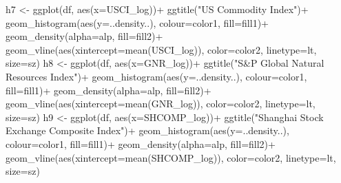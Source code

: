 \documentclass[
]{article}
\newenvironment{Shaded}{\begin{snugshade}}{\end{snugshade}}
\newcommand{\AttributeTok}[1]{\textcolor[rgb]{0.77,0.63,0.00}{#1}}
\newcommand{\FunctionTok}[1]{\textcolor[rgb]{0.00,0.00,0.00}{#1}}
\newcommand{\NormalTok}[1]{#1}
\newcommand{\OtherTok}[1]{\textcolor[rgb]{0.56,0.35,0.01}{#1}}
\newcommand{\SpecialCharTok}[1]{\textcolor[rgb]{0.00,0.00,0.00}{#1}}
\newcommand{\StringTok}[1]{\textcolor[rgb]{0.31,0.60,0.02}{#1}}
\begin{document}
\begin{Shaded}
\begin{Highlighting}[]
\NormalTok{h7 }\OtherTok{\textless{}{-}} \FunctionTok{ggplot}\NormalTok{(df, }\FunctionTok{aes}\NormalTok{(}\AttributeTok{x=}\NormalTok{USCI\_log))}\SpecialCharTok{+} \FunctionTok{ggtitle}\NormalTok{(}\StringTok{"US Commodity Index"}\NormalTok{)}\SpecialCharTok{+}
  \FunctionTok{geom\_histogram}\NormalTok{(}\FunctionTok{aes}\NormalTok{(}\AttributeTok{y=}\NormalTok{..density..), }\AttributeTok{colour=}\NormalTok{color1, }\AttributeTok{fill=}\NormalTok{fill1)}\SpecialCharTok{+}
  \FunctionTok{geom\_density}\NormalTok{(}\AttributeTok{alpha=}\NormalTok{alp, }\AttributeTok{fill=}\NormalTok{fill2)}\SpecialCharTok{+}
  \FunctionTok{geom\_vline}\NormalTok{(}\FunctionTok{aes}\NormalTok{(}\AttributeTok{xintercept=}\FunctionTok{mean}\NormalTok{(USCI\_log)), }\AttributeTok{color=}\NormalTok{color2, }\AttributeTok{linetype=}\NormalTok{lt, }\AttributeTok{size=}\NormalTok{sz)}
\NormalTok{h8 }\OtherTok{\textless{}{-}} \FunctionTok{ggplot}\NormalTok{(df, }\FunctionTok{aes}\NormalTok{(}\AttributeTok{x=}\NormalTok{GNR\_log))}\SpecialCharTok{+} \FunctionTok{ggtitle}\NormalTok{(}\StringTok{"S\&P Global Natural Resources Index"}\NormalTok{)}\SpecialCharTok{+}
  \FunctionTok{geom\_histogram}\NormalTok{(}\FunctionTok{aes}\NormalTok{(}\AttributeTok{y=}\NormalTok{..density..), }\AttributeTok{colour=}\NormalTok{color1, }\AttributeTok{fill=}\NormalTok{fill1)}\SpecialCharTok{+}
  \FunctionTok{geom\_density}\NormalTok{(}\AttributeTok{alpha=}\NormalTok{alp, }\AttributeTok{fill=}\NormalTok{fill2)}\SpecialCharTok{+}
  \FunctionTok{geom\_vline}\NormalTok{(}\FunctionTok{aes}\NormalTok{(}\AttributeTok{xintercept=}\FunctionTok{mean}\NormalTok{(GNR\_log)), }\AttributeTok{color=}\NormalTok{color2, }\AttributeTok{linetype=}\NormalTok{lt, }\AttributeTok{size=}\NormalTok{sz)}
\NormalTok{h9 }\OtherTok{\textless{}{-}} \FunctionTok{ggplot}\NormalTok{(df, }\FunctionTok{aes}\NormalTok{(}\AttributeTok{x=}\NormalTok{SHCOMP\_log))}\SpecialCharTok{+} \FunctionTok{ggtitle}\NormalTok{(}\StringTok{"Shanghai Stock Exchange Composite Index"}\NormalTok{)}\SpecialCharTok{+}
  \FunctionTok{geom\_histogram}\NormalTok{(}\FunctionTok{aes}\NormalTok{(}\AttributeTok{y=}\NormalTok{..density..), }\AttributeTok{colour=}\NormalTok{color1, }\AttributeTok{fill=}\NormalTok{fill1)}\SpecialCharTok{+}
  \FunctionTok{geom\_density}\NormalTok{(}\AttributeTok{alpha=}\NormalTok{alp, }\AttributeTok{fill=}\NormalTok{fill2)}\SpecialCharTok{+}
  \FunctionTok{geom\_vline}\NormalTok{(}\FunctionTok{aes}\NormalTok{(}\AttributeTok{xintercept=}\FunctionTok{mean}\NormalTok{(SHCOMP\_log)), }\AttributeTok{color=}\NormalTok{color2, }\AttributeTok{linetype=}\NormalTok{lt, }\AttributeTok{size=}\NormalTok{sz)}

\end{Highlighting}
\end{Shaded}
\end{document}
